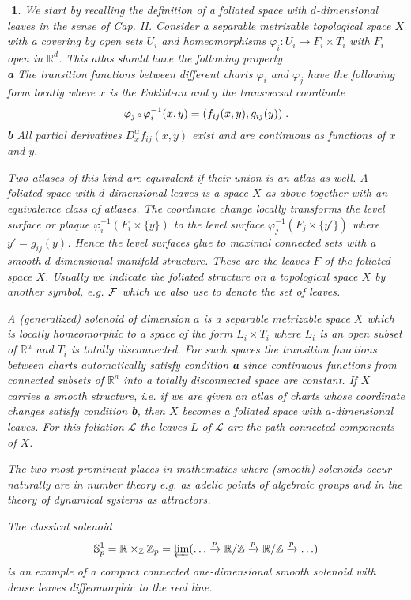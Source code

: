 \documentclass[11pt,leqno]{article}
\newcommand{\Sa}{{\mathbb{S}}}
\newcommand{\R}{{\mathbb{R}}}
\newcommand{\Z}{{\mathbb{Z}}}
\newcommand{\Fh}{{\cal F}}
\newcommand{\Lh}{{\mathcal L}}
\newcommand{\verk}{\mbox{\scriptsize $\,\circ\,$}}
\newtheorem{punkt}[theorem]{$\!\!$}
\begin{document}
\begin{punkt} \label{t11} \rm
We start by recalling the definition of a foliated space with $d$-dimensional leaves in the sense of \cite{MS} Cap. II. Consider a separable metrizable topological space $X$ with a covering by open sets $U_i$ and homeomorphisms $\varphi_i : U_i \to F_i \times T_i$ with $F_i$ open in $\R^d$. This atlas should have the following property\\
{\bf a} \quad The transition functions between different charts $\varphi_i$ and $\varphi_j$ have the following form locally where $x$ is the Euklidean and $y$ the transversal coordinate
\[
\varphi_j \verk \varphi^{-1}_i (x,y) = (f_{ij} (x,y) , g_{ij} (y)) \; .
\]
{\bf b} \quad All partial derivatives $D^{\alpha}_x f_{ij} (x,y)$ exist and are continuous as functions of $x$ and $y$.

Two atlases of this kind are equivalent if their union is an atlas as well. A foliated space with $d$-dimensional leaves is a space $X$ as above together with an equivalence class of atlases. The coordinate change locally transforms the level surface or plaque $\varphi^{-1}_i (F_i \times \{ y \} )$ to the level surface $\varphi^{-1}_j (F_j \times \{ y' \})$ where $y' = g_{ij} (y)$. Hence the level surfaces glue to maximal connected sets with a smooth $d$-dimensional manifold structure. These are the leaves $F$ of the foliated space $X$. Usually we indicate the foliated structure on a topological space $X$ by another symbol, e.g. $\Fh$ which we also use to denote the set of leaves.

A (generalized) solenoid of dimension $a$ is a separable metrizable space $X$ which is locally homeomorphic to a space of the form $L_i \times T_i$ where $L_i$ is an open subset of $\R^a$ and $T_i$ is totally disconnected. For such spaces the transition functions between charts automatically satisfy condition {\bf a} since continuous functions from connected subsets of $\R^a$ into a totally disconnected space are constant. If $X$ carries a smooth structure, i.e. if we are given an atlas of charts whose coordinate changes satisfy condition {\bf b}, then $X$ becomes a foliated space with $a$-dimensional leaves. For this foliation $\Lh$ the leaves $L$ of $\Lh$ are the path-connected components of $X$.

The two most prominent places in mathematics where (smooth) solenoids occur naturally are in number theory e.g. as adelic points of algebraic groups and in the theory of dynamical systems as attractors.

The classical solenoid
\[
\Sa^1_p = \R \times_{\Z} \Z_p = \varprojlim ( \ldots \xrightarrow{p} \R / \Z \xrightarrow{p} \R / \Z \xrightarrow{p} \ldots)
\]
is an example of a compact connected one-dimensional smooth solenoid with dense leaves diffeomorphic to the real line.


\end{punkt}
\end{document}
